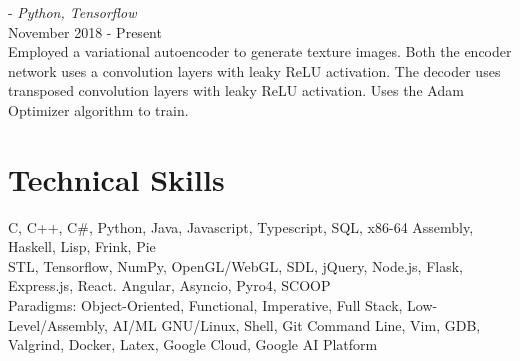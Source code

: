 \documentclass[12pt]{article}
\begin{document}
	 - \emph{Python, Tensorflow} \\
	\noindent November 2018 - Present\\
	\noindent Employed a variational autoencoder to generate texture images. Both the encoder network uses a convolution layers with leaky ReLU activation.
	The decoder uses transposed convolution layers with leaky ReLU activation. Uses the Adam Optimizer algorithm to train.
	\noindent \\

	

	\section*{Technical Skills}
		 \normalsize{C, C++, C\#, Python, Java, Javascript, Typescript, SQL, x86-64 Assembly, Haskell, Lisp, Frink, Pie}\\
		  \normalsize{STL, Tensorflow, NumPy, OpenGL/WebGL, SDL, jQuery, Node.js, Flask, Express.js, React. Angular, Asyncio, Pyro4, SCOOP}\\
		\noindent \normalsize{Paradigms:} \normalsize{Object-Oriented, Functional, Imperative, Full Stack, Low-Level/Assembly, AI/ML}
		 \normalsize{GNU/Linux, Shell, Git Command Line, Vim, GDB, Valgrind, Docker, Latex, Google Cloud, Google AI Platform}\\
\end{document}
